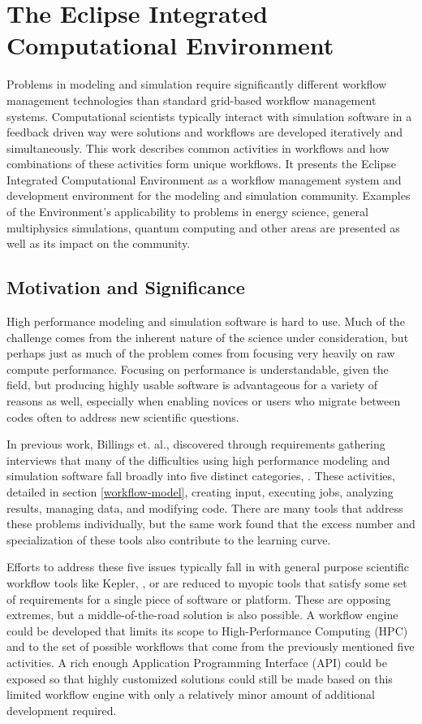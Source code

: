 \chapter{The Eclipse Integrated Computational Environment}

Problems in modeling and simulation require significantly different
workflow management technologies than standard grid-based workflow
management systems. Computational scientists typically interact with
simulation software in a feedback driven way were solutions and
workflows are developed iteratively and simultaneously. This work
describes common activities in workflows and how combinations of these
activities form unique workflows. It presents the Eclipse Integrated
Computational Environment as a workflow management system and
development environment for the modeling and simulation community.
Examples of the Environment's applicability to problems in energy
science, general multiphysics simulations, quantum computing and other
areas are presented as well as its impact on the community.

\section{Motivation and Significance}\label{motivation-and-significance}

High performance modeling and simulation software is hard to use. Much
of the challenge comes from the inherent nature of the science under
consideration, but perhaps just as much of the problem comes from
focusing very heavily on raw compute performance. Focusing on
performance is understandable, given the field, but producing highly usable
software is advantageous for a variety of reasons as well, especially when
enabling novices or users who migrate between codes often to address new
scientific questions.

In previous work, Billings et. al., discovered through requirements
gathering interviews that many of the difficulties using high
performance modeling and simulation software fall broadly into five
distinct categories, \cite{billings_designing_2009}. These activities,
detailed in section \ref{workflow-model}, creating input, executing jobs,
analyzing results, managing data, and modifying code. There are many
tools that address these problems individually, but the same work found
that the excess number and specialization of these tools also contribute
to the learning curve.

Efforts to address these five issues typically fall in with general
purpose scientific workflow tools like Kepler, \cite{ludascher_scientific_2006},
or are reduced to myopic tools that satisfy some set of requirements for a
single piece of software or platform. These are opposing extremes, but a
middle-of-the-road solution is also possible. A workflow engine could be
developed that limits its scope to High-Performance Computing (HPC) and
to the set of possible workflows that come from the previously mentioned
five activities. A rich enough Application Programming Interface (API)
could be exposed so that highly customized solutions could still be made
based on this limited workflow engine with only a relatively minor
amount of additional development required.

